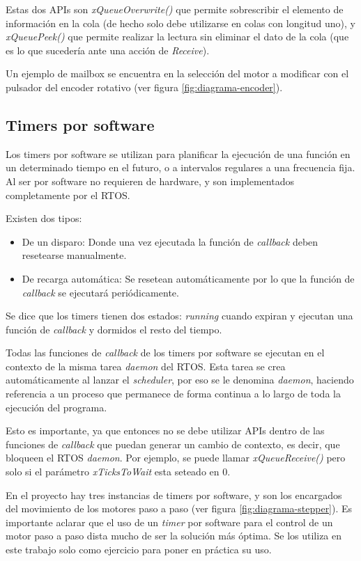 \documentclass{IEEEtran}
\begin{document}
Estas dos APIs son \textit{xQueueOverwrite()} que permite sobrescribir el elemento de información en la cola (de hecho solo debe utilizarse en colas con longitud uno), y \textit{xQueuePeek()} que permite realizar la lectura sin eliminar el dato de la cola (que es lo que sucedería ante una acción de \textit{Receive}).

Un ejemplo de mailbox se encuentra en la selección del motor a modificar con el pulsador del encoder rotativo (ver figura \ref{fig:diagrama-encoder}).

\subsection{Timers por software}
\label{sec:software-timer}
Los timers por software se utilizan para planificar la ejecución de una función en un determinado tiempo en el futuro, o a intervalos regulares a una frecuencia fija. Al ser por software no requieren de hardware, y son implementados completamente por el RTOS.

Existen dos tipos:
\begin{itemize}
    \item De un disparo: Donde una vez ejecutada la función de \textit{callback} deben resetearse manualmente.
    \item De recarga automática: Se resetean automáticamente por lo que la función de \textit{callback} se ejecutará periódicamente.
\end{itemize}

Se dice que los timers tienen dos estados: \textit{running} cuando expiran y ejecutan una función de \textit{callback} y dormidos el resto del tiempo.

Todas las funciones de \textit{callback} de los timers por software se ejecutan en el contexto de la misma tarea \textit{daemon} del RTOS. Esta tarea se crea automáticamente al lanzar el \textit{scheduler}, por eso se le denomina \textit{daemon}, haciendo referencia a un proceso que permanece de forma continua a lo largo de toda la ejecución del programa.

Esto es importante, ya que entonces no se debe utilizar APIs dentro de las funciones de \textit{callback} que puedan generar un cambio de contexto, es decir, que bloqueen el RTOS \textit{daemon}. Por ejemplo, se puede llamar \textit{xQueueReceive()} pero solo si el parámetro \textit{xTicksToWait} esta seteado en 0.

En el proyecto hay tres instancias de timers por software, y son los encargados del movimiento de los motores paso a paso (ver figura \ref{fig:diagrama-stepper}). Es importante aclarar que el uso de un \textit{timer} por software para el control de un motor paso a paso dista mucho de ser la solución más óptima. Se los utiliza en este trabajo solo como ejercicio para poner en práctica su uso.
\end{document}
